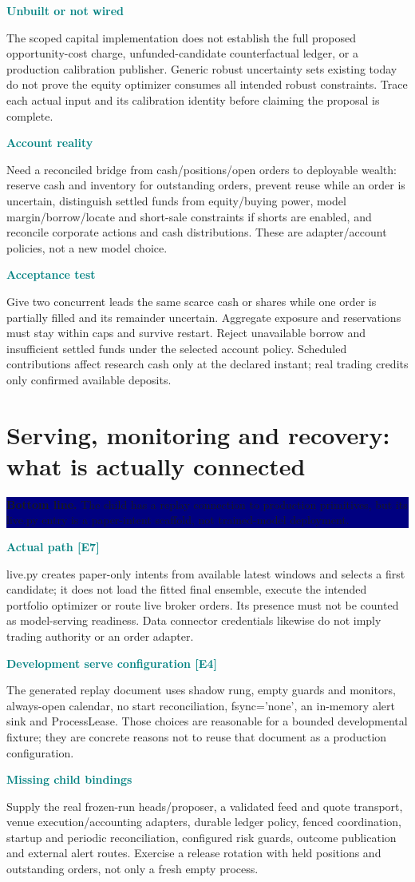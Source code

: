 \documentclass[10pt,letterpaper]{article}
\newcommand{\bl}[1]{\noindent\colorbox{navy}{\parbox{\dimexpr\linewidth-2\fboxsep}{\color{white}\textbf{Bottom line.} #1}}\par\medskip}
\newcommand{\topic}[2]{\clearpage\section{#1}\bl{#2}}
\newcommand{\sub}[1]{\par\textbf{\textcolor{teal}{#1}}\par}
\begin{document}
\sub{Unbuilt or not wired}
The scoped capital implementation does not establish the full proposed opportunity-cost charge, unfunded-candidate counterfactual ledger, or a production calibration publisher. Generic robust uncertainty sets existing today do not prove the equity optimizer consumes all intended robust constraints. Trace each actual input and its calibration identity before claiming the proposal is complete.
\sub{Account reality}
Need a reconciled bridge from cash/positions/open orders to deployable wealth: reserve cash and inventory for outstanding orders, prevent reuse while an order is uncertain, distinguish settled funds from equity/buying power, model margin/borrow/locate and short-sale constraints if shorts are enabled, and reconcile corporate actions and cash distributions. These are adapter/account policies, not a new model choice.
\sub{Acceptance test}
Give two concurrent leads the same scarce cash or shares while one order is partially filled and its remainder uncertain. Aggregate exposure and reservations must stay within caps and survive restart. Reject unavailable borrow and insufficient settled funds under the selected account policy. Scheduled contributions affect research cash only at the declared instant; real trading credits only confirmed available deposits.
\topic{Serving, monitoring and recovery: what is actually connected}{The child has a replay connection to production primitives, but its live.py entry is a paper-intent scaffold, not trained-model deployment.}
\sub{Actual path [E7]}
live.py creates paper-only intents from available latest windows and selects a first candidate; it does not load the fitted final ensemble, execute the intended portfolio optimizer or route live broker orders. Its presence must not be counted as model-serving readiness. Data connector credentials likewise do not imply trading authority or an order adapter.
\sub{Development serve configuration [E4]}
The generated replay document uses shadow rung, empty guards and monitors, always-open calendar, no start reconciliation, fsync='none', an in-memory alert sink and ProcessLease. Those choices are reasonable for a bounded developmental fixture; they are concrete reasons not to reuse that document as a production configuration.
\sub{Missing child bindings}
Supply the real frozen-run heads/proposer, a validated feed and quote transport, venue execution/accounting adapters, durable ledger policy, fenced coordination, startup and periodic reconciliation, configured risk guards, outcome publication and external alert routes. Exercise a release rotation with held positions and outstanding orders, not only a fresh empty process.
\end{document}
